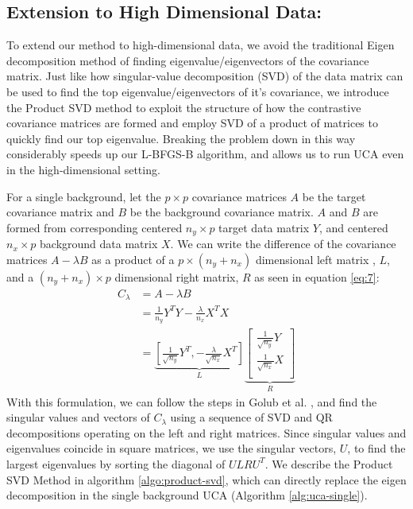 \documentclass[12pt]{article}
\begin{document}
\subsection{Extension to High Dimensional Data:}
To extend our method to high-dimensional data, we avoid the traditional Eigen decomposition method of finding eigenvalue/eigenvectors of the covariance matrix. Just like how singular-value decomposition (SVD) of the data matrix can be used to find the top eigenvalue/eigenvectors of it's covariance, we introduce the Product SVD method to exploit the structure of how the contrastive covariance matrices are formed and employ SVD of a product of matrices to quickly find our top eigenvalue.  Breaking the problem down in this way considerably speeds up our L-BFGS-B algorithm, and allows us to run UCA even in the high-dimensional setting.

For a single background, let the $p \times p$ covariance matrices $A$ be the target covariance matrix and $B$ be the background covariance matrix. $A$ and $B$ are formed from corresponding centered $n_y \times p$ target data matrix $Y$,   and centered $n_x \times p$ background data matrix $X$.  We can write the difference of the covariance matrices $A - \lambda B$ as a product of a $p \times (n_y + n_x)$ dimensional left matrix , $L$, and a $(n_y + n_x) \times p$ dimensional right matrix, $R$ as seen in equation \ref{eq:7}:
\begin{align}
C_\lambda &= A - \lambda B \nonumber\\
 &=\frac{1}{n_y}Y^TY -\frac{\lambda}{n_x} X^T X\nonumber \\
 &=  \underbrace{\left[ \frac{1}{\sqrt{n_{y}}}Y^T, - \frac{\lambda}{\sqrt{n_{x}}} X^T\right]}_{L}\underbrace{\begin{bmatrix*} \frac{1}{\sqrt{n_{y}}}Y \\ \frac{1}{\sqrt{n_{x}}}X \\ \end{bmatrix*}}_{R} \label{eq:7}
\end{align}
With this formulation, we can follow the steps in Golub et al.  \cite{Golub}, and find the singular values and vectors of $C_\lambda$ using a sequence of SVD and QR decompositions operating on the left and right matrices. Since singular values and eigenvalues coincide in square matrices, we use the singular vectors, $U$, to find the largest eigenvalues by sorting the diagonal of $ULRU^T$.  
We describe the Product SVD Method in algorithm \ref{algo:product-svd}, which can directly replace the eigen decomposition in the single background UCA (Algorithm \ref{alg:uca-single}).
\end{document}
